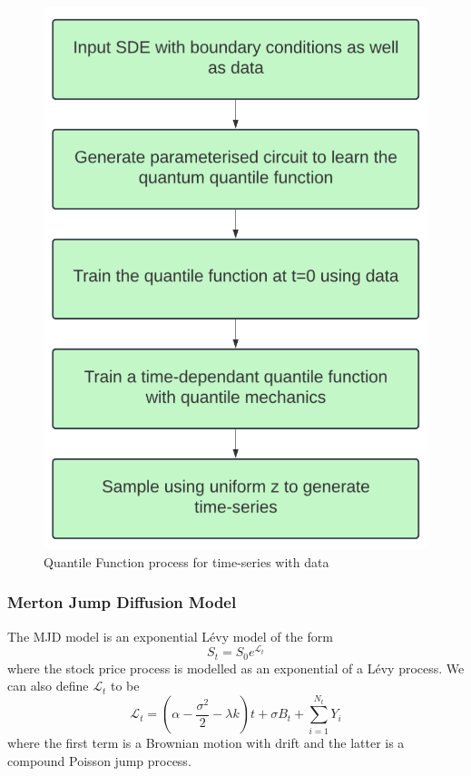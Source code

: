 \documentclass[12pt]{article}
\numberwithin{equation}{section}
\begin{document}
\begin{figure}[ht!]
    \centering
    \includegraphics[scale=0.35]{qf.png}
    \caption{Quantile Function process for time-series with data}
\end{figure}
\subsubsection{Merton Jump Diffusion Model}
The MJD model is an exponential L\'{e}vy model of the form 
\begin{equation}
  S_t = S_0e^{\mathcal{L}_t}
\end{equation}
where the stock price process is modelled as an exponential of a L\'{e}vy process. 
We can also define $\mathcal{L}_t$ to be 
\begin{equation}
  \mathcal{L}_t = (\alpha - \frac{\sigma^2}{2}-\lambda k)t + \sigma B_t + 
  \sum^{N_t}_{i=1}Y_i
\end{equation}
where the first term is a Brownian motion with drift and the latter is a 
compound Poisson jump process. 
\clearpage
\end{document}
